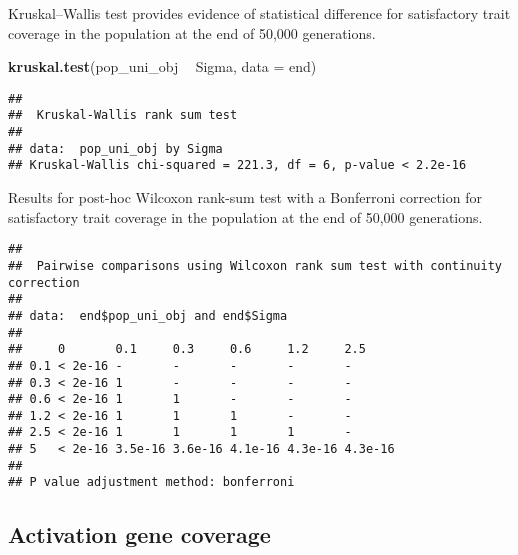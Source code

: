 \documentclass[]{book}
\newenvironment{Shaded}{\begin{snugshade}}{\end{snugshade}}
\newcommand{\DataTypeTok}[1]{\textcolor[rgb]{0.13,0.29,0.53}{#1}}
\newcommand{\KeywordTok}[1]{\textcolor[rgb]{0.13,0.29,0.53}{\textbf{#1}}}
\newcommand{\NormalTok}[1]{#1}
\newcommand{\OperatorTok}[1]{\textcolor[rgb]{0.81,0.36,0.00}{\textbf{#1}}}
\newcommand{\OtherTok}[1]{\textcolor[rgb]{0.56,0.35,0.01}{#1}}
\newcommand{\StringTok}[1]{\textcolor[rgb]{0.31,0.60,0.02}{#1}}
\begin{document}
Kruskal--Wallis test provides evidence of statistical difference for satisfactory trait coverage in the population at the end of 50,000 generations.

\begin{Shaded}
\begin{Highlighting}[]
\KeywordTok{kruskal.test}\NormalTok{(pop_uni_obj }\OperatorTok{~}\StringTok{ }\NormalTok{Sigma, }\DataTypeTok{data =}\NormalTok{ end)}
\end{Highlighting}
\end{Shaded}

\begin{verbatim}
## 
##  Kruskal-Wallis rank sum test
## 
## data:  pop_uni_obj by Sigma
## Kruskal-Wallis chi-squared = 221.3, df = 6, p-value < 2.2e-16
\end{verbatim}

Results for post-hoc Wilcoxon rank-sum test with a Bonferroni correction for satisfactory trait coverage in the population at the end of 50,000 generations.

\begin{Shaded}
\end{Shaded}

\begin{verbatim}
## 
##  Pairwise comparisons using Wilcoxon rank sum test with continuity correction 
## 
## data:  end$pop_uni_obj and end$Sigma 
## 
##     0       0.1     0.3     0.6     1.2     2.5    
## 0.1 < 2e-16 -       -       -       -       -      
## 0.3 < 2e-16 1       -       -       -       -      
## 0.6 < 2e-16 1       1       -       -       -      
## 1.2 < 2e-16 1       1       1       -       -      
## 2.5 < 2e-16 1       1       1       1       -      
## 5   < 2e-16 3.5e-16 3.6e-16 4.1e-16 4.3e-16 4.3e-16
## 
## P value adjustment method: bonferroni
\end{verbatim}

\hypertarget{activation-gene-coverage-10}{%
\subsection{Activation gene coverage}\label{activation-gene-coverage-10}}
\end{document}
